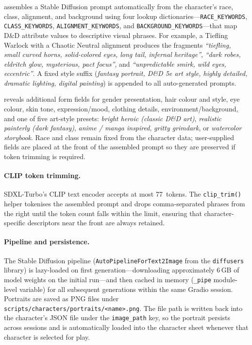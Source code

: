\documentclass[12pt,a4paper]{article}
\begin{document}
\begin{description}[noitemsep]
    \item[Auto (from character stats)] assembles a Stable Diffusion prompt
        automatically from the character's race, class, alignment, and
        background using four lookup dictionaries---\texttt{RACE\_KEYWORDS},
        \texttt{CLASS\_KEYWORDS}, \texttt{ALIGNMENT\_KEYWORDS}, and
        \texttt{BACKGROUND\_KEYWORDS}---that map D\&D attribute values to
        descriptive visual phrases. For example, a Tiefling Warlock with a
        Chaotic Neutral alignment produces the fragments
        \emph{``tiefling, small curved horns, solid-colored eyes, long tail,
        infernal heritage''}, \emph{``dark robes, eldritch glow, mysterious,
        pact focus''}, and \emph{``unpredictable smirk, wild eyes, eccentric''}.
        A fixed style suffix (\emph{fantasy portrait, D\&D 5e art style, highly
        detailed, dramatic lighting, digital painting}) is appended to all
        auto-generated prompts.
    \item[Custom] reveals additional form fields for gender presentation,
        hair colour and style, eye colour, skin tone, expression/mood,
        clothing details, environment/background, and one of five art-style
        presets: \emph{bright heroic (classic D\&D art)},
        \emph{realistic painterly (dark fantasy)},
        \emph{anime / manga inspired}, \emph{gritty grimdark}, or
        \emph{watercolor storybook}. Race and class remain fixed from the
        character data; user-supplied fields are placed at the front of the
        assembled prompt so they are preserved if token trimming is required.
\end{description}

\paragraph{CLIP token trimming.}
SDXL-Turbo's CLIP text encoder accepts at most 77~tokens. The
\texttt{clip\_trim()} helper tokenises the assembled prompt and drops
comma-separated phrases from the right until the token count falls within the
limit, ensuring that character-specific descriptors near the front are always
retained.

\paragraph{Pipeline and persistence.}
The Stable Diffusion pipeline (\texttt{Auto\-Pipeline\-For\-Text2\-Image} from
the \texttt{diffusers} library) is lazy-loaded on first generation---downloading
approximately 6\,GB of model weights on the initial run---and then cached in
memory (\texttt{\_pipe} module-level variable) for all subsequent generations
within the same Gradio session. Portraits are saved as PNG files under
\texttt{scripts/characters/portraits/<name>.png}. The file path is written
back into the character's JSON file under the \texttt{image\_path} key, so
the portrait persists across sessions and is automatically loaded into the
character sheet whenever that character is selected for play.
\end{document}
